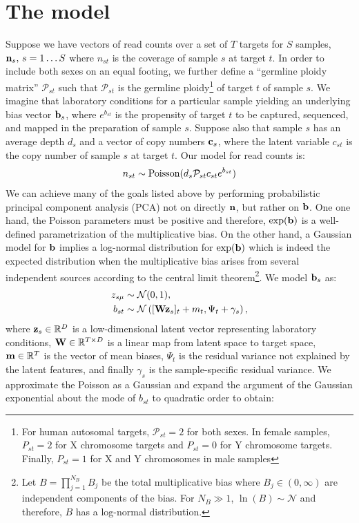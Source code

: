 \documentclass[nofootinbib,amssymb,amsmath]{revtex4}
\newcommand{\vb}{{\bf b}}
\newcommand{\vc}{{\bf c}}
\newcommand{\vz}{{\bf z}}
\newcommand{\vn}{{\bf n}}
\newcommand{\vm}{{\bf m}}
\newcommand{\vW}{{\bf W}}
\newcommand{\PP}{\mathcal{P}}
\newcommand{\norm}{{\mathcal N}}
\begin{document}
\section{The model}
Suppose we have vectors of read counts over a set of $T$ targets for $S$ samples, $\vn_s, \, s = 1 \ldots S$ where $n_{st}$ is the coverage of sample $s$ at target $t$. In order to include both sexes on an equal footing, we further define a ``germline ploidy matrix'' $\PP_{st}$ such that $\PP_{st}$ is the germline ploidy\footnote{For human autosomal targets, $\PP_{st} = 2$ for both sexes. In female samples, $P_{st} = 2$ for X chromosome targets and $P_{st} = 0$ for Y chromosome targets. Finally, $P_{st} = 1$ for X and Y chromosomes in male samples} of target $t$ of sample $s$. We imagine that laboratory conditions for a particular sample yielding an underlying bias vector $\vb_s$, where $e^{b_{st}}$ is the propensity of target $t$ to be captured, sequenced, and mapped in the preparation of sample $s$. Suppose also that sample $s$ has an average depth $d_s$ and a vector of copy numbers $\vc_s$, where the latent variable $c_{st}$ is the copy number of sample $s$ at target $t$. Our model for read counts is:
%
\begin{equation}
n_{st} \sim {\rm Poisson}(d_s \PP_{st} c_{st} e^{b_{st}})
\label{coverage_model}
\end{equation}
We can achieve many of the goals listed above by performing probabilistic principal component analysis (PCA) not on directly $\vn$, but rather on $\vb$. One one hand, the Poisson parameters must be positive and therefore, $\exp(\vb)$ is a well-defined parametrization of the multiplicative bias. On the other hand, a Gaussian model for $\vb$ implies a log-normal distribution for $\exp(\vb)$ which is indeed the expected distribution when the multiplicative bias arises from several independent sources according to the central limit theorem\footnote{Let $B = \prod_{j=1}^{N_B} B_j$ be the total multiplicative bias where $B_j \in (0, \infty)$ are independent components of the bias. For $N_B \gg 1$, $\ln(B) \sim \mathcal{N}$ and therefore, $B$ has a log-normal distribution.}. We model $\vb_s$ as:
%
\begin{align}
z_{s\mu} &\sim \norm(0, 1), \nonumber\\
b_{st} &\sim \norm\left([\vW \vz_s]_t + m_t, \Psi_t + \gamma_s\right),
\end{align}
%
where $\vz_s \in \mathbb{R}^D$ is a low-dimensional latent vector representing laboratory conditions, $\vW \in \mathbb{R}^{T \times D}$ is a linear map from latent space to target space, $\vm \in \mathbb{R}^T$ is the vector of mean biases, $\Psi_t$ is the residual variance not explained by the latent features, and finally $\gamma_s$ is the sample-specific residual variance. We approximate the Poisson as a Gaussian and expand the argument of the Gaussian exponential about the mode of $b_{st}$ to quadratic order to obtain:
\end{document}
